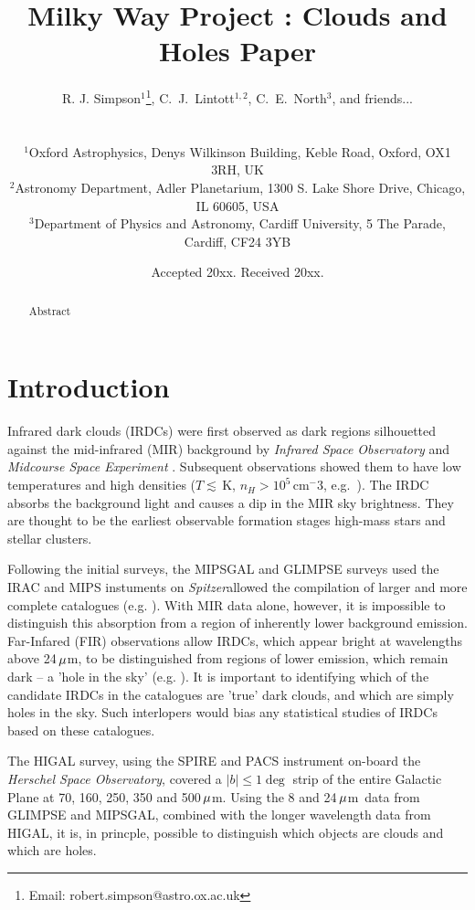 \documentclass[a4,useAMS,usenatbib]{mn2e}
\title{Milky Way Project : Clouds and Holes Paper}
\author[Simpson et al.]
{\parbox{\textwidth}{R. J. Simpson$^{1}$\thanks{Email: robert.simpson@astro.ox.ac.uk},
C.~J.~Lintott$^{1,2}$,
C.~E.~North$^3$,
and friends...}\vspace{0.8cm}\\
\parbox{\textwidth}{
$^{1}$Oxford Astrophysics, Denys Wilkinson Building, Keble Road, Oxford, OX1 3RH, UK \\
$^{2}$Astronomy Department, Adler Planetarium, 1300 S. Lake Shore Drive, Chicago, IL 60605, USA \\
$^{3}$Department of Physics and Astronomy, Cardiff University, 5 The Parade, Cardiff, CF24 3YB }}
\def\spitzer{{\em Spitzer}}
\def\mic{$\umu$m}
\begin{document}
\date{Accepted 20xx. Received 20xx.}

\pagerange{\pageref{firstpage}--\pageref{lastpage}} 

\maketitle

\label{firstpage}

\begin{abstract}
Abstract
\end{abstract}

\section{Introduction}
Infrared dark clouds (IRDCs) were first observed as dark regions
silhouetted against the mid-infrared (MIR) background
\citep{Wilcock2012a} by \emph{Infrared Space Observatory} \citep{ISO}
and \emph{Midcourse Space Experiment} \citep{ISO}. Subsequent
observations showed them to have low temperatures and high densities
($T\lesssim$\,K, $n_H > 10^5$\,cm$^-3$,
e.g.~\citet{Egan98,Carey98,HennebellePerault02}). The IRDC absorbs the
background light and causes a dip in the MIR sky brightness. They are
thought to be the earliest observable formation stages high-mass stars
and stellar clusters.

Following the initial surveys, the MIPSGAL and GLIMPSE surveys used
the IRAC and MIPS instuments on \spitzer allowed the compilation of
larger and more complete catalogues (e.g. \citet{PF09}). With MIR data
alone, however, it is impossible to distinguish this absorption from a
region of inherently lower background emission. Far-Infared (FIR)
observations allow IRDCs, which appear bright at wavelengths above
24\,\mic, to be distinguished from regions of lower emission, which
remain dark -- a 'hole in the sky'
(e.g. \citet{Stanke2010_NGC1999}). It is important to identifying
which of the candidate IRDCs in the catalogues are 'true' dark clouds,
and which are simply holes in the sky. Such interlopers would bias any
statistical studies of IRDCs based on these catalogues.

The HIGAL survey, using the SPIRE and PACS instrument on-board
the \emph{Herschel Space Observatory}, covered a $|b|\le 1\deg$ strip
of the entire Galactic Plane at 70, 160, 250, 350 and 500\,\mic. Using
the 8 and 24\,\mic\ data from GLIMPSE and MIPSGAL, combined with the
longer wavelength data from HIGAL, it is, in princple, possible to
distinguish which objects are clouds and which are holes.
\end{document}
